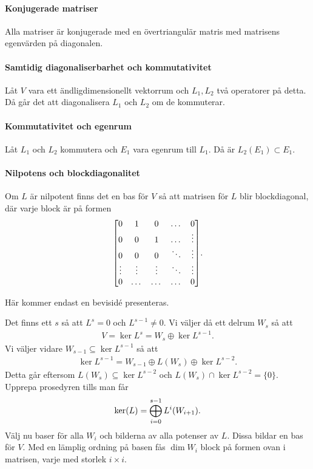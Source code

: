 \proof

\paragraph{Konjugerade matriser}
Alla matriser är konjugerade med en övertriangulär matris med matrisens egenvärden på diagonalen.

\paragraph{Samtidig diagonaliserbarhet och kommutativitet}
Låt $V$ vara ett ändligdimensionellt vektorrum och $L_{1}, L_{2}$ två operatorer på detta. Då går det att diagonalisera $L_{1}$ och $L_{2}$ om de kommuterar.

\proof

\paragraph{Kommutativitet och egenrum}
Låt $L_{1}$ och $L_{2}$ kommutera och $E_{1}$ vara egenrum till $L_{1}$. Då är $L_{2}(E_{1})\subset E_{1}$.

\proof

\paragraph{Nilpotens och blockdiagonalitet}
Om $L$ är nilpotent finns det en bas för $V$ så att matrisen för $L$ blir blockdiagonal, där varje block är på formen
\begin{align*}
	\mqty[
		0      & 1      & 0      & \dots  & 0 \\
		0      & 0      & 1      & \dots  & \vdots \\
		0      & 0      & 0      & \ddots & \vdots \\
		\vdots & \vdots & \vdots & \ddots & \vdots \\
		0      & \dots  & \dots  & \dots  & 0
	].
\end{align*}

\proof
Här kommer endast en bevisidé presenteras.

Det finns ett $s$ så att $L^{s} = 0$ och $L^{s - 1} \neq 0$. Vi väljer då ett delrum $W_{s}$ så att
\begin{align*}
	V = \ker{L^{s}} = W_{s} \oplus \ker{L^{s - 1}}.
\end{align*}
Vi väljer vidare $W_{s - 1}\subseteq\ker{L^{s - 1}}$ så att
\begin{align*}
	\ker{L^{s - 1}} = W_{s - 1} \oplus L(W_{s}) \oplus \ker{L^{s - 2}}.
\end{align*}
Detta går eftersom $L(W_{s}) \subseteq \ker{L^{s - 2}}$ och $L(W_{s}) \cap \ker{L^{s - 2}} = \{0\}$. Upprepa prosedyren tills man får
\begin{align*}
	\text{ker}(L) = \bigoplus\limits_{i = 0}^{s - 1}L^{i}(W_{i + 1}).
\end{align*}
Välj nu baser för alla $W_{i}$ och bilderna av alla potenser av $L$. Dissa bildar en bas för $V$. Med en lämplig ordning på basen fås $\dim{W_{i}}$ block på formen ovan i matrisen, varje med storlek $i\times i$.

